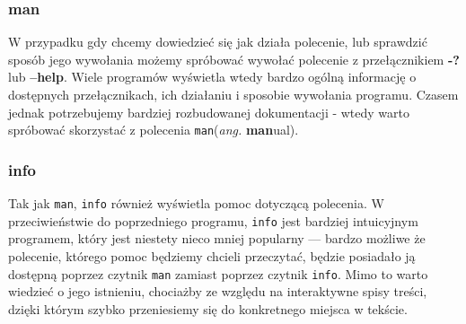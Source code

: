 \subsubsection{man}
W przypadku gdy chcemy dowiedzieć się jak działa polecenie, lub sprawdzić sposób jego wywołania możemy spróbować wywołać polecenie z przełącznikiem \textbf{-?} lub \textbf{--help}. Wiele programów wyświetla wtedy bardzo ogólną informację o dostępnych przełącznikach, ich działaniu i sposobie wywołania programu. Czasem jednak potrzebujemy bardziej rozbudowanej dokumentacji - wtedy warto spróbować skorzystać z polecenia \texttt{man}(\textit{ang.} \textbf{man}ual).

\subsubsection{info}
Tak jak \texttt{man}, \texttt{info} również wyświetla pomoc dotyczącą polecenia. W przeciwieństwie do poprzedniego programu, \texttt{info} jest bardziej intuicyjnym programem, który jest niestety nieco mniej popularny --- bardzo możliwe że polecenie, którego pomoc będziemy chcieli przeczytać, będzie posiadało ją dostępną poprzez czytnik \texttt{man} zamiast poprzez czytnik \texttt{info}. Mimo to warto wiedzieć o jego istnieniu, chociażby ze względu na interaktywne spisy treści, dzięki którym szybko przeniesiemy się do konkretnego miejsca w tekście.

